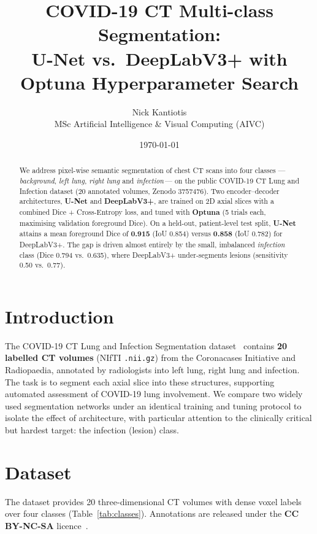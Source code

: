 \documentclass[11pt,a4paper]{article}
\title{\textbf{COVID-19 CT Multi-class Segmentation:\\
U-Net vs.\ DeepLabV3+ with Optuna Hyperparameter Search}}
\author{Nick Kantiotis\\\small MSc Artificial Intelligence \& Visual Computing (AIVC)}
\date{\today}
\begin{document}
\maketitle

\begin{abstract}
\noindent
We address pixel-wise semantic segmentation of chest CT scans into four classes
---\,\emph{background}, \emph{left lung}, \emph{right lung} and \emph{infection}\,---
on the public COVID-19 CT Lung and Infection dataset (20 annotated volumes, Zenodo
3757476). Two encoder--decoder architectures, \textbf{U-Net} and \textbf{DeepLabV3+},
are trained on 2D axial slices with a combined Dice + Cross-Entropy loss, and tuned with
\textbf{Optuna} (5 trials each, maximising validation foreground Dice). On a held-out,
patient-level test split, \textbf{U-Net} attains a mean foreground Dice of \textbf{0.915}
(IoU 0.854) versus \textbf{0.858} (IoU 0.782) for DeepLabV3+. The gap is driven almost
entirely by the small, imbalanced \emph{infection} class (Dice 0.794 vs.\ 0.635), where
DeepLabV3+ under-segments lesions (sensitivity 0.50 vs.\ 0.77).
\end{abstract}

\tableofcontents
\bigskip

\section{Introduction}
The COVID-19 CT Lung and Infection Segmentation dataset~\cite{ma2020} contains
\textbf{20 labelled CT volumes} (NIfTI \texttt{.nii.gz}) from the Coronacases Initiative
and Radiopaedia, annotated by radiologists into left lung, right lung and infection.
The task is to segment each axial slice into these structures, supporting automated
assessment of COVID-19 lung involvement. We compare two widely used segmentation
networks under an identical training and tuning protocol to isolate the effect of
architecture, with particular attention to the clinically critical but hardest target:
the infection (lesion) class.

\section{Dataset}
The dataset provides 20 three-dimensional CT volumes with dense voxel labels over four
classes (Table~\ref{tab:classes}). Annotations are released under the
\textbf{CC BY-NC-SA} licence~\cite{ma2020}.
\end{document}
